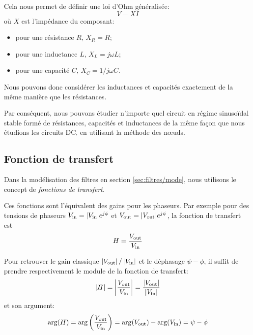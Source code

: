 Cela nous permet de définir une loi d'Ohm généralisée:
\begin{equation}
    V = XI
\end{equation}
où $X$ est l'impédance du composant:
\begin{itemize}
    \item pour une résistance $R$, $X_R=R$;
    \item pour une inductance $L$, $X_L=j\omega L$;
    \item pour une capacité $C$, $X_C=1/j\omega C$.
\end{itemize}
Nous pouvons donc considérer les inductances et capacités
exactement de la même manière que les résistances.

Par conséquent, nous pouvons étudier n'importe quel circuit
en régime sinusoïdal stable formé de résistances,
capacités et inductances de la même façon que nous étudions
les circuits DC, en utilisant la méthode des nœuds.

\subsection{Fonction de transfert}

Dans la modélisation des filtres en section \ref{sec:filtres/mode},
nous utilisons le concept de \emph{fonctions de transfert}.

Ces fonctions sont l'équivalent des gains pour les phaseurs.
Par exemple pour des tensions de phaseurs
$V_{\mathrm{in}}=|V_{\mathrm{in}}|e^{j\phi}$ et $V_{\mathrm{out}}=|V_{\mathrm{out}}|e^{j\psi}$,
la fonction de transfert est
\begin{equation}
    H = \frac{V_{\mathrm{out}}}{V_{\mathrm{in}}}
\end{equation}

Pour retrouver le gain classique $|V_{\mathrm{out}}|\,/\,|V_{\mathrm{in}}|$
et le déphasage $\psi-\phi$,
il suffit de prendre respectivement le module de la fonction de transfert:
\begin{equation}
    |H| = \left|\frac{V_{\mathrm{out}}}{V_{\mathrm{in}}}\right|
    = \frac{|V_{\mathrm{out}}|}{|V_{\mathrm{in}}|}
\end{equation}
et son argument:
\begin{equation}
    \arg(H) = \arg\left(\frac{V_{\mathrm{out}}}{V_{\mathrm{in}}}\right)
    = \arg(V_{\mathrm{out}}) - \arg(V_{\mathrm{in}})
    = \psi-\phi
\end{equation}
